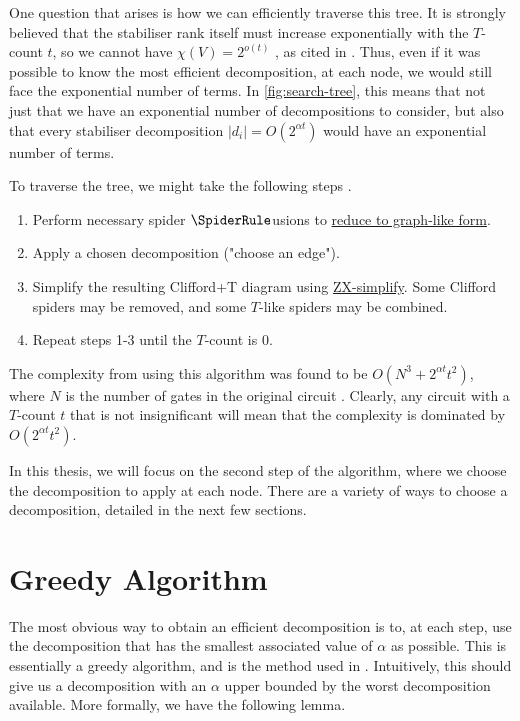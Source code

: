 One question that arises is how we can efficiently traverse this tree.
It is strongly believed that the stabiliser rank itself must increase exponentially with the $T$-count $t$,
so we cannot have $\chi(V) = 2^{o(t)}$ \cite{Morimae:2019onp}, as cited in \cite{Qassim_2021}.
Thus, even if it was possible to know the most efficient decomposition, at each node,
we would still face the exponential number of terms.
In \autoref{fig:search-tree}, this means that not just that we have an exponential 
number of decompositions to consider, but also that 
every stabiliser decomposition $|d_i| = O(2^{\alpha t})$ would have an exponential number of terms.

\begin{alg}
\label{alg:stabiliser-decomposition}
To traverse the tree, we might take the following steps \cite{Kissinger2022cat,Kissinger_2022}.
\begin{enumerate}    
    \item Perform necessary spider $\SpiderRule$usions to 
    \hyperref[prop:zx-to-graph]{reduce to graph-like form}.
    \item Apply a chosen decomposition ("choose an edge").
    \item Simplify the resulting Clifford+T diagram using \hyperref[alg:zx-simplify]{ZX-simplify}.
    Some Clifford spiders may be removed, and some $T$-like spiders may be combined.
    \item Repeat steps 1-3 until the $T$-count is 0.
\end{enumerate}
\end{alg}

The complexity from using this algorithm was found to be $O(N^3 + 2^{\alpha t}t^2)$, 
where $N$ is the number of gates in the original circuit \cite{Kissinger_2022}.
Clearly, any circuit with a $T$-count $t$ that is not insignificant will mean that 
the complexity is dominated by $O(2^{\alpha t}t^2)$.

In this thesis, we will focus on the second step of the algorithm, 
where we choose the decomposition to apply at each node.
There are a variety of ways to choose a decomposition, detailed in the next few sections.



\section{Greedy Algorithm}

The most obvious way to obtain an efficient decomposition is to, at each step, use the decomposition 
that has the smallest associated value of $\alpha$ as possible.
This is essentially a greedy algorithm, and is the method used in \cite{Kissinger2022cat,Kissinger_2022}.
Intuitively, this should give us a decomposition with an $\alpha$ upper bounded by 
the worst decomposition available.
More formally, we have the following lemma.


